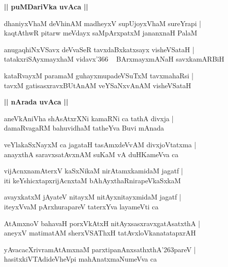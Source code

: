 \documentclass[twoside,12pt,openright]{book}
\def\S{\char'263}
\newcounter{shloka}[chapter]
\def\uvaca#1{\centerline{{\large\textbf{#1}}}}
\begin{document}
\uvaca{|| puMDariVka uvAca ||}

\begin{shloka}%
dhaniyxVhaM deVhinAM madheyxV supUjoyxVhaM sureYrapi |\\
kaqtAthwR pitarw meVdayx saMpArxpatxM jananxnaH PalaM 
\end{shloka}

\begin{shloka}%
anugaqhiNxVSavx deVvaSeR tavxdaBxkatxsayx visheVSataH |\\
tatakxriSAyxmayxhaM vidavx\char'366 ~ BArxmayxmANaH savxkamARBiH 
\end{shloka}

\begin{shloka}%
kataRvayxM paramaM guhayxmupadeVSuTxM tavxmahaRsi |\\
tavxM gatisasxravxBUtAnAM veYSaNxvAnAM visheVSataH 
\end{shloka}

\uvaca{|| nArada uvAca ||}

\begin{shloka}%
aneVkAniVha shAsAtxrXNi kamaRNi ca tathA divxja |\\
damaRvagaRM bahuvidhaM tatheYva Buvi mAnada
\end{shloka}

\begin{shloka}%
veYlakaSxNayxM ca jagataH tasAmxdeVvAM divxjoVtatxma |\\
anayxthA saravxsatAvxnAM suKaM vA duHKameVva ca 
\end{shloka}

\begin{shloka}%
vijAcnxnamAterxV kaSxNikaM nirAtamxkamidaM jagatf |\\
iti keYshicxtapxrijAcnxtaM bAhAyxthaRnirapeVkaSxkaM 
\end{shloka}

\begin{shloka}%
avayxkatxM jAyateV nitayxM nitAyxnitayxmidaM jagatf |\\
iteyxVvaM pArxhurapareV taterxYva layameVti ca 
\end{shloka}

\begin{shloka}%
AtAmxnoV bahavaH porxVkAtxH nitAyxsasxravxgatAsatxthA |\\
aneyxV matimatAM sherxVSAThxH tatAvxloVkanatatapxrAH 
\end{shloka}

\begin{shloka}%
yAvacacXrivramAtAmxnaM parxtipanAnxsathxthA\S pareV |\\
hasitxkiVTAdideVheVpi mahAnatxmaNumeVva ca 
\end{shloka}
\end{document}
